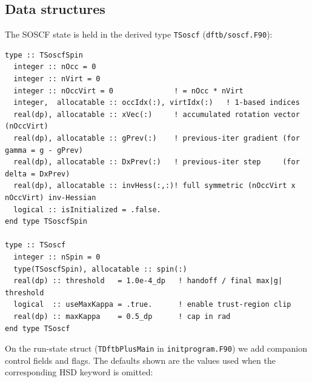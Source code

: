 \documentclass[11pt,a4paper]{article}
\begin{document}
\subsection{Data structures}

The SOSCF state is held in the derived type \texttt{TSoscf}
(\texttt{dftb/soscf.F90}):

\begin{lstlisting}[style=fortran,caption={\texttt{TSoscfSpin} (per spin channel) and \texttt{TSoscf} (top-level), from \texttt{dftb/soscf.F90}.}]
type :: TSoscfSpin
  integer :: nOcc = 0
  integer :: nVirt = 0
  integer :: nOccVirt = 0              ! = nOcc * nVirt
  integer,  allocatable :: occIdx(:), virtIdx(:)   ! 1-based indices
  real(dp), allocatable :: xVec(:)     ! accumulated rotation vector (nOccVirt)
  real(dp), allocatable :: gPrev(:)    ! previous-iter gradient (for gamma = g - gPrev)
  real(dp), allocatable :: DxPrev(:)   ! previous-iter step     (for delta = DxPrev)
  real(dp), allocatable :: invHess(:,:)! full symmetric (nOccVirt x nOccVirt) inv-Hessian
  logical :: isInitialized = .false.
end type TSoscfSpin

type :: TSoscf
  integer :: nSpin = 0
  type(TSoscfSpin), allocatable :: spin(:)
  real(dp) :: threshold   = 1.0e-4_dp   ! handoff / final max|g| threshold
  logical  :: useMaxKappa = .true.      ! enable trust-region clip
  real(dp) :: maxKappa    = 0.5_dp      ! cap in rad
end type TSoscf
\end{lstlisting}

On the run-state struct (\texttt{TDftbPlusMain} in
\texttt{initprogram.F90}) we add companion control fields and flags.
The defaults shown are the values used when the corresponding HSD
keyword is omitted:
\end{document}
